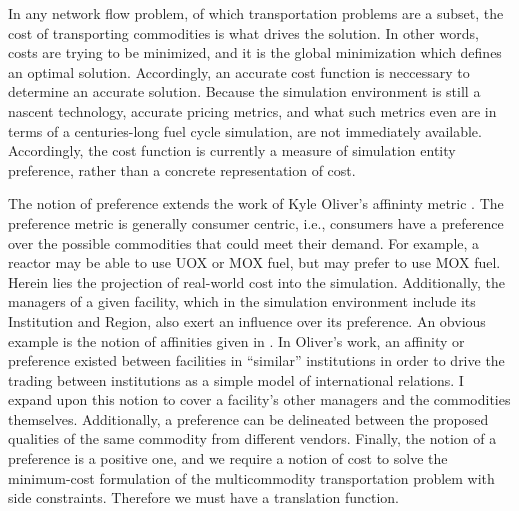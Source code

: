In any network flow problem, of which transportation problems are a subset, the
cost of transporting commodities is what drives the solution. In other words,
costs are trying to be minimized, and it is the global minimization which
defines an optimal solution. Accordingly, an accurate cost function is
neccessary to determine an accurate solution. Because the \Cyclus simulation
environment is still a nascent technology, accurate pricing metrics, and what
such metrics even are in terms of a centuries-long fuel cycle simulation, are
not immediately available. Accordingly, the cost function is currently a measure
of simulation entity preference, rather than a concrete representation of cost.

The notion of preference extends the work of Kyle Oliver's affininty metric
\cite{oliver_geniusv2:_2009}. The preference metric is generally consumer
centric, i.e., consumers have a preference over the possible commodities that
could meet their demand. For example, a reactor may be able to use UOX or MOX
fuel, but may prefer to use MOX fuel. Herein lies the projection of real-world
cost into the simulation. Additionally, the managers of a given facility, which
in the \Cyclus simulation environment include its Institution and Region, also
exert an influence over its preference. An obvious example is the notion of
affinities given in \cite{oliver_geniusv2:_2009}. In Oliver's work, an affinity
or preference existed between facilities in ``similar'' institutions in order to
drive the trading between institutions as a simple model of international
relations. I expand upon this notion to cover a facility's other managers and
the commodities themselves. Additionally, a preference can be delineated between
the proposed qualities of the same commodity from different vendors. Finally,
the notion of a preference is a positive one, and we require a notion of cost to
solve the minimum-cost formulation of the multicommodity transportation problem
with side constraints. Therefore we must have a translation function.


